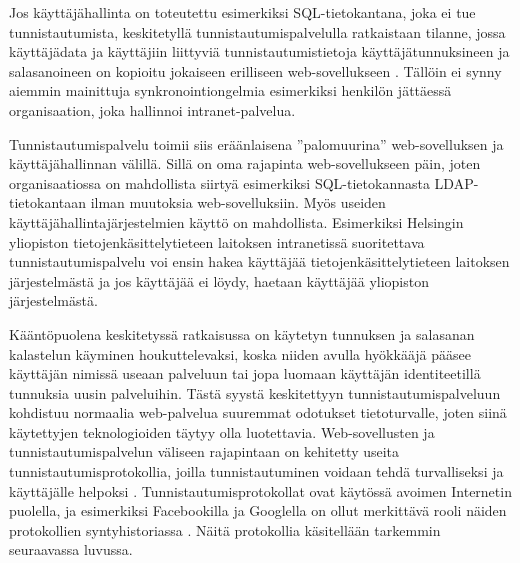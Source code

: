 Jos käyttäjähallinta on toteutettu esimerkiksi SQL-tietokantana, joka ei tue tunnistautumista, keskitetyllä tunnistautumispalvelulla ratkaistaan tilanne, jossa käyttäjädata ja käyttäjiin liittyviä tunnistautumistietoja käyttäjätunnuksineen ja salasanoineen on kopioitu jokaiseen erilliseen web-sovellukseen \cite{billion_keys}. Tällöin ei synny aiemmin mainittuja synkronointiongelmia esimerkiksi henkilön jättäessä organisaation, joka hallinnoi intranet-palvelua.

Tunnistautumispalvelu toimii siis eräänlaisena ''palomuurina'' web-sovelluksen ja käyttäjähallinnan välillä. Sillä on oma rajapinta web-sovellukseen päin, joten organisaatiossa on mahdollista siirtyä esimerkiksi SQL-tietokannasta LDAP-tietokantaan ilman muutoksia web-sovelluksiin. Myös useiden käyttäjähallintajärjestelmien käyttö on mahdollista. Esimerkiksi Helsingin yliopiston tietojenkäsittelytieteen laitoksen intranetissä suoritettava tunnistautumispalvelu voi ensin hakea käyttäjää tietojenkäsittelytieteen laitoksen järjestelmästä ja jos käyttäjää ei löydy, haetaan käyttäjää yliopiston järjestelmästä.

Kääntöpuolena keskitetyssä ratkaisussa on käytetyn tunnuksen ja salasanan kalastelun käyminen houkuttelevaksi, koska niiden avulla hyökkääjä pääsee käyttäjän nimissä useaan palveluun tai jopa luomaan käyttäjän identiteetillä tunnuksia uusin palveluihin. Tästä syystä keskitettyyn tunnistautumispalveluun kohdistuu normaalia web-palvelua suuremmat odotukset tietoturvalle, joten siinä käytettyjen teknologioiden täytyy olla luotettavia. Web-sovellusten ja tunnistautumispalvelun väliseen rajapintaan on kehitetty useita tunnistautumisprotokollia, joilla tunnistautuminen voidaan tehdä turvalliseksi ja käyttäjälle helpoksi \cite{open_identity}. Tunnistautumisprotokollat ovat käytössä avoimen Internetin puolella, ja esimerkiksi Facebookilla ja Googlella on ollut merkittävä rooli näiden protokollien syntyhistoriassa \cite{open_identity}. Näitä protokollia käsitellään tarkemmin seuraavassa luvussa.